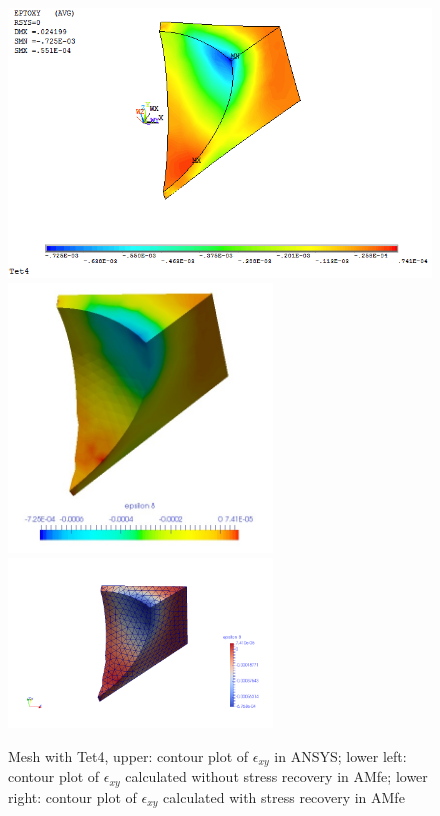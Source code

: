 \begin{figure}[htbp]
	\begin{center}
		\includegraphics[width=13cm,clip]{Tet4Exy.png} 	
		\includegraphics[width=7cm,clip]{Tet4ExyPD.png} 			
		\includegraphics[width=7cm,clip]{Tet4ExyP.png} 		
		\caption{Mesh with Tet4, upper: contour plot of $\epsilon_{xy}$ in ANSYS; lower left: contour plot of $\epsilon_{xy}$ calculated without stress recovery in AMfe; lower right: contour plot of $\epsilon_{xy}$ calculated with stress recovery in AMfe} \label{fig: Tet4_Exy}
	\end{center}
\end{figure}
\clearpage 

